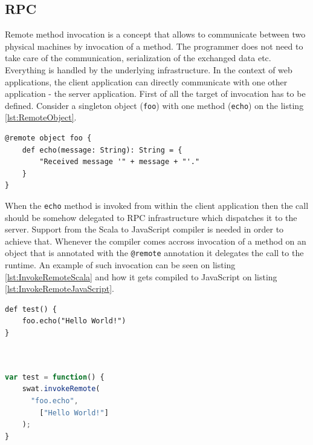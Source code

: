 \documentclass[12pt,a4paper]{report}
\begin{document}
\subsection{RPC}

Remote method invocation is a concept that allows to communicate between two physical machines by invocation of a method. The programmer does not need to take care of the communication, serialization of the exchanged data etc. Everything is handled by the underlying infrastructure. In the context of web applications, the client application can directly communicate with one other application - the server application. First of all the target of invocation has to be defined. Consider a singleton object (\texttt{foo}) with one method (\texttt{echo}) on the listing \ref{lst:RemoteObject}.

\begin{minipage}{\linewidth}
\begin{lstlisting}[caption={A remote object.},label={lst:RemoteObject}]
@remote object foo {
	def echo(message: String): String = {
		"Received message '" + message + "'."
	}
}
\end{lstlisting}
\end{minipage}

When the \texttt{echo} method is invoked from within the client application then the call should be somehow delegated to RPC infrastructure which dispatches it to the server. Support from the Scala to JavaScript compiler is needed in order to achieve that. Whenever the compiler comes accross invocation of a method on an object that is annotated with the \texttt{@remote} annotation it delegates the call to the runtime. An example of such invocation can be seen on listing \ref{lst:InvokeRemoteScala} and how it gets compiled to JavaScript on listing \ref{lst:InvokeRemoteJavaScript}.

\begin{center}
\begin{minipage}{.48\textwidth}
  \begin{lstlisting}[caption={Remote method invocation in Scala.},label={lst:InvokeRemoteScala},showlines=true]
def test() {
	foo.echo("Hello World!")
}



  \end{lstlisting}
\end{minipage}
\hfill
\begin{minipage}{.48\textwidth}
  \begin{lstlisting}[language=JavaScript,caption={Remote method invocation in JavaScript.},label={lst:InvokeRemoteJavaScript}]
var test = function() {
	swat.invokeRemote(
	  "foo.echo", 
		["Hello World!"]
	);
}
  \end{lstlisting}
\end{minipage}
\end{center}
\end{document}
